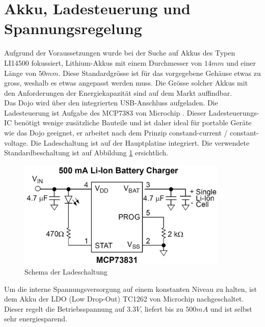 \section{Akku, Ladesteuerung und Spannungsregelung}

Aufgrund der Voraussetzungen wurde bei der Suche auf Akkus des Typen LI14500 fokussiert, Lithium-Akkus mit einem Durchmesser von $14mm$ und einer Länge von $50mm$. Diese Standardgrösse ist für das vorgegebene Gehäuse etwas zu gross, weshalb es etwas angepasst werden muss. Die Grösse solcher Akkus mit den Anforderungen der Energiekapazität sind auf dem Markt auffindbar.\\

Das Dojo wird über den integrierten USB-Anschluss aufgeladen. Die Ladesteuerung ist Aufgabe des MCP7383 von Microchip . Dieser Ladesteuerungs-IC benötigt wenige zusätzliche Bauteile und ist daher ideal für portable Geräte wie das Dojo geeignet, er arbeitet nach dem Prinzip constand-current / constant-voltage. Die Ladeschaltung ist auf der Hauptplatine integriert. Die verwendete Standardbeschaltung ist auf Abbildung \ref{fig:Ladeschaltung} ersichtlich.\\

\begin{figure}[htp]
	\centering
	\includegraphics[width=10cm]{Bilder/LadeschaltungSchema.JPG}
	 \caption{Schema der Ladeschaltung}
	 \label{fig:Ladeschaltung}
\end{figure}

Um die interne Spannungsversorgung auf einem konstanten Niveau zu halten, ist dem Akku der LDO (Low Drop-Out) TC1262 von Microchip nachgeschaltet. Dieser regelt die Betriebsspannung auf $3.3V$, liefert bis zu $500mA$ und ist selbst sehr energiesparend.


